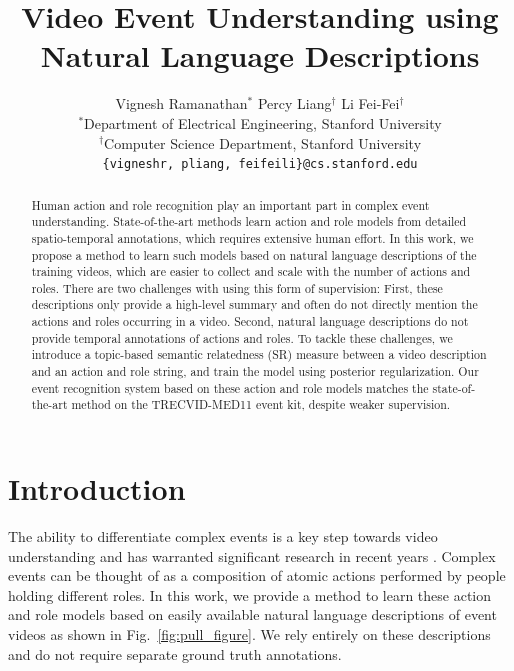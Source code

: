\documentclass[10pt,twocolumn,letterpaper]{article}
\begin{document}
\title{Video Event Understanding using Natural Language Descriptions}

\author{Vignesh Ramanathan$^*$ \quad \quad Percy Liang$^\dagger$ \quad \quad Li Fei-Fei$^\dagger$ \\
$^*$Department of Electrical Engineering, Stanford University \\
$^\dagger$Computer Science Department, Stanford University\\
{\tt\small \{vigneshr, pliang, feifeili\}@cs.stanford.edu}
}
\maketitle

\begin{abstract}
Human action and role recognition play an important part in complex event understanding. 
State-of-the-art methods learn action and role models from detailed spatio-temporal annotations, 
which requires extensive human effort. 
In this work, we propose a method to learn such models based on natural language descriptions of the training videos, 
which are easier to collect and scale with the number of actions and roles. 
There are two challenges with using this form of supervision: First, these descriptions only provide a high-level summary 
and often do not directly mention the actions and roles occurring in a video. 
Second, natural language descriptions do not provide temporal annotations of actions and roles. 
To tackle these challenges, we introduce a topic-based semantic relatedness (SR) measure between a video description 
and an action and role string, and train the model using posterior regularization. 
Our event recognition system based on these action and role models matches the state-of-the-art method on 
the TRECVID-MED11 event kit, despite weaker supervision. %
\end{abstract}

\section{Introduction}
The ability to differentiate complex events is a key step towards video
understanding and has warranted significant research in recent years
\cite{Merler_ITM12, Izadinia_ECCV12, Rohrbach_ECCV12}. Complex
events can be thought of as a composition of atomic actions performed by
people holding different roles. In this work, we provide a method to
learn these action and role models based on easily available natural language
descriptions of event videos as shown in Fig.~\ref{fig:pull_figure}. We rely
entirely on these descriptions and do not require separate ground truth annotations.
\end{document}
